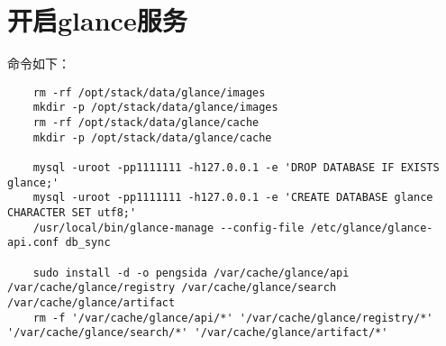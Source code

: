 \documentclass[a4paper,left=1.5cm,right=1.5cm,11pt]{article}
\begin{document}
\section{开启glance服务}
	命令如下：
	\begin{lstlisting}
	rm -rf /opt/stack/data/glance/images
	mkdir -p /opt/stack/data/glance/images
	rm -rf /opt/stack/data/glance/cache
	mkdir -p /opt/stack/data/glance/cache

	mysql -uroot -pp1111111 -h127.0.0.1 -e 'DROP DATABASE IF EXISTS glance;'
	mysql -uroot -pp1111111 -h127.0.0.1 -e 'CREATE DATABASE glance CHARACTER SET utf8;'
	/usr/local/bin/glance-manage --config-file /etc/glance/glance-api.conf db_sync

	sudo install -d -o pengsida /var/cache/glance/api /var/cache/glance/registry /var/cache/glance/search /var/cache/glance/artifact
	rm -f '/var/cache/glance/api/*' '/var/cache/glance/registry/*' '/var/cache/glance/search/*' '/var/cache/glance/artifact/*'
	\end{lstlisting}
\end{document}
